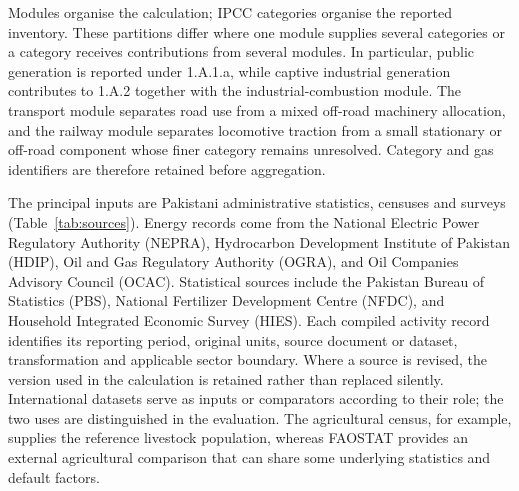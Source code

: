 \documentclass[essd]{copernicus}
\begin{document}
Modules organise the calculation; IPCC categories organise the reported inventory. These partitions differ where one module supplies several categories or a category receives contributions from several modules. In particular, public generation is reported under 1.A.1.a, while captive industrial generation contributes to 1.A.2 together with the industrial-combustion module. The transport module separates road use from a mixed off-road machinery allocation, and the railway module separates locomotive traction from a small stationary or off-road component whose finer category remains unresolved. Category and gas identifiers are therefore retained before aggregation.

The principal inputs are Pakistani administrative statistics, censuses and surveys (Table~\ref{tab:sources}). Energy records come from the National Electric Power Regulatory Authority (NEPRA), Hydrocarbon Development Institute of Pakistan (HDIP), Oil and Gas Regulatory Authority (OGRA), and Oil Companies Advisory Council (OCAC). Statistical sources include the Pakistan Bureau of Statistics (PBS), National Fertilizer Development Centre (NFDC), and Household Integrated Economic Survey (HIES). Each compiled activity record identifies its reporting period, original units, source document or dataset, transformation and applicable sector boundary. Where a source is revised, the version used in the calculation is retained rather than replaced silently. International datasets serve as inputs or comparators according to their role; the two uses are distinguished in the evaluation. The agricultural census, for example, supplies the reference livestock population, whereas FAOSTAT provides an external agricultural comparison that can share some underlying statistics and default factors.
\end{document}
